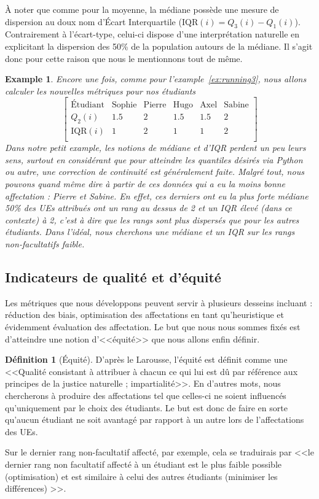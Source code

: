 \documentclass{rapport}
\theoremstyle{definition}
\newtheorem{definition}{Définition}
\theoremstyle{remark}
\theoremstyle{plain}
\newtheorem{example}{Example}
\theoremstyle{definition}
\theoremstyle{remark}
\begin{document}
À noter que comme pour la moyenne, la médiane possède une mesure de dispersion au doux nom d'Écart Interquartile ($\text{IQR}(i) = Q_3(i)-Q_1(i)$).
Contrairement à l'écart-type, celui-ci dispose d'une interprétation naturelle en explicitant la dispersion des 50\% de la population autours de la médiane.
Il s'agit donc pour cette raison que nous le mentionnons tout de même.

\begin{example}\label{ex:running4}
    Encore une fois, comme pour l'example~\ref{ex:running3}, nous allons calculer les nouvelles métriques pour nos étudiants
    $$
    \begin{bmatrix}
        \text{Étudiant} & \text{Sophie} & \text{Pierre} & \text{Hugo} & \text{Axel} & \text{Sabine}\\
        Q_2(i)          & 1.5 & 2 & 1.5 & 1.5 & 2\\
        \text{IQR}(i)   & 1   & 2 & 1   & 1   & 2\\
    \end{bmatrix}
    $$
    Dans notre petit example, les notions de médiane et d'IQR perdent un peu leurs sens, surtout en considérant que pour atteindre les quantiles désirés via Python ou autre, une correction de continuité est généralement faite.
    Malgré tout, nous pouvons quand même dire à partir de ces données qui a eu la moins bonne affectation : Pierre et Sabine.
    En effet, ces derniers ont eu la plus forte médiane 50\% des UEs attribués ont un rang au dessus de 2 et un IQR élevé (dans ce contexte) à 2, c'est à dire que les rangs sont  plus dispersés que pour les autres étudiants.
    Dans l'idéal, nous cherchons une médiane et un IQR sur les rangs non-facultatifs faible.
\end{example}

\subsection{Indicateurs de qualité et d'équité}
Les métriques que nous développons peuvent servir à plusieurs desseins incluant : réduction des biais, optimisation des affectations en tant qu'heuristique et évidemment évaluation des affectation.
Le but que nous nous sommes fixés est d'atteindre une notion d'<<équité>> que nous allons enfin définir.

\begin{definition}[Équité]
    D'après le Larousse, l'équité est définit comme une <<Qualité consistant à attribuer à chacun ce qui lui est dû par référence aux principes de la justice naturelle ; impartialité>>.
    En d'autres mots, nous chercherons à produire des affectations tel que celles-ci ne soient influencés qu'uniquement par le choix des étudiants. Le but est donc de faire en sorte qu'aucun étudiant ne soit avantagé par rapport à un autre lors de l'affectations des UEs.

    Sur le dernier rang non-facultatif affecté, par exemple, cela se traduirais par <<le dernier rang non facultatif affecté à un étudiant est le plus faible possible (optimisation) et est similaire à celui des autres étudiants (minimiser les différences) >>.
\end{definition}
\end{document}
